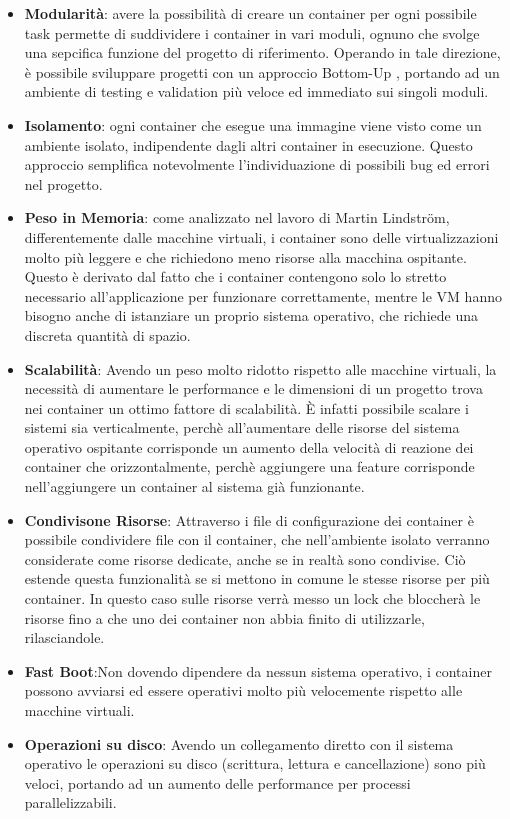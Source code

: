 \begin{itemize}
    \item \textbf{Modularità}: avere la possibilità di creare un container per ogni possibile task permette di suddividere i container in vari moduli, ognuno che svolge una sepcifica funzione del progetto di riferimento. Operando in tale direzione, è possibile sviluppare progetti con un approccio Bottom-Up
        , portando ad un ambiente di testing e validation più veloce ed immediato sui singoli moduli.
    \item \textbf{Isolamento}: ogni container che esegue una immagine viene visto come un ambiente isolato, indipendente dagli altri container in esecuzione. Questo approccio semplifica notevolmente l'individuazione di possibili bug ed errori nel progetto.
    \item \textbf{Peso in Memoria}: come analizzato nel lavoro di Martin Lindström\cite{performance-container}, differentemente dalle macchine virtuali, i container sono delle virtualizzazioni molto più leggere e che richiedono meno risorse alla macchina ospitante. Questo è derivato dal fatto che i container contengono solo lo stretto necessario all'applicazione per funzionare correttamente,
        mentre le VM hanno bisogno anche di istanziare un proprio sistema operativo, che richiede una discreta quantità di spazio.
    \item \textbf{Scalabilità}: Avendo un peso molto ridotto rispetto alle macchine virtuali, la necessità di aumentare le performance e le dimensioni di un progetto trova nei container un ottimo fattore di scalabilità. È  infatti possibile scalare i sistemi sia verticalmente, perchè all'aumentare delle risorse del sistema operativo ospitante corrisponde un aumento della velocità di reazione dei container
    che orizzontalmente, perchè aggiungere una feature corrisponde nell'aggiungere un container al sistema già funzionante. 
    \item \textbf{Condivisone Risorse}: Attraverso i file di configurazione dei container è possibile condividere file con il container, che nell'ambiente isolato verranno considerate come risorse dedicate, anche se in realtà sono condivise. Ciò estende questa funzionalità se si mettono in comune le stesse risorse per più container. In questo caso sulle risorse verrà messo un lock che bloccherà le risorse fino a che
        uno dei container non abbia finito di utilizzarle, rilasciandole.
    \item \textbf{Fast Boot}:Non dovendo dipendere da nessun sistema operativo, i container possono avviarsi ed essere operativi molto più velocemente rispetto alle macchine virtuali.
    \item \textbf{Operazioni su disco}: Avendo un collegamento diretto con il sistema operativo le operazioni su  disco (scrittura, lettura e cancellazione) sono più veloci, portando ad un aumento delle performance per processi parallelizzabili.
\end{itemize}


